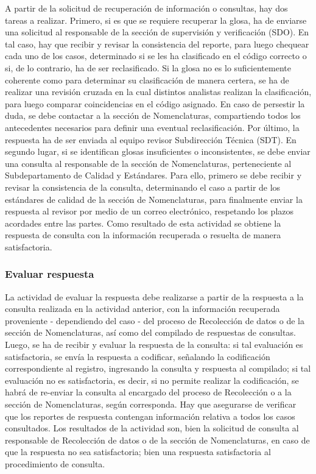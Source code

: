 \documentclass[
]{article}
\begin{document}
A partir de la solicitud de recuperación de información o consultas, hay dos tareas a realizar. Primero, si es que se requiere recuperar la glosa, ha de enviarse una solicitud al responsable de la sección de supervisión y verificación (SDO). En tal caso, hay que recibir y revisar la consistencia del reporte, para luego chequear cada uno de los casos, determinado si se les ha clasificado en el código correcto o si, de lo contrario, ha de ser reclasificado. Si la glosa no es lo suficientemente coherente como para determinar su clasificación de manera certera, se ha de realizar una revisión cruzada en la cual distintos analistas realizan la clasificación, para luego comparar coincidencias en el código asignado. En caso de persestir la duda, se debe contactar a la sección de Nomenclaturas, compartiendo todos los antecedentes necesarios para definir una eventual reclasificación. Por último, la respuesta ha de ser enviada al equipo revisor Subdirección Técnica (SDT). En segundo lugar, si se identifican glosas insuficientes o inconsistentes, se debe enviar una consulta al responsable de la sección de Nomenclaturas, perteneciente al Subdepartamento de Calidad y Estándares. Para ello, primero se debe recibir y revisar la consistencia de la consulta, determinando el caso a partir de los estándares de calidad de la sección de Nomenclaturas, para finalmente enviar la respuesta al revisor por medio de un correo electrónico, respetando los plazos acordades entre las partes. Como resultado de esta actividad se obtiene la respuesta de consulta con la información recuperada o resuelta de manera satisfactoria.

\hypertarget{evaluar-respuesta}{%
\subsubsection{Evaluar respuesta}\label{evaluar-respuesta}}

La actividad de evaluar la respuesta debe realizarse a partir de la respuesta a la consulta realizada en la actividad anterior, con la información recuperada proveniente - dependiendo del caso - del proceso de Recolección de datos o de la sección de Nomenclaturas, así como del compilado de respuestas de consultas. Luego, se ha de recibir y evaluar la respuesta de la consulta: si tal evaluación es satisfactoria, se envía la respuesta a codificar, señalando la codificación correspondiente al registro, ingresando la consulta y respuesta al compilado; si tal evaluación no es satisfactoria, es decir, si no permite realizar la codificación, se habrá de re-enviar la consulta al encargado del proceso de Recolección o a la sección de Nomenclaturas, según corresponda. Hay que asegurarse de verificar que los reportes de respuesta contengan información relativa a todos los casos consultados. Los resultados de la actividad son, bien la solicitud de consulta al responsable de Recolección de datos o de la sección de Nomenclaturas, en caso de que la respuesta no sea satisfactoria; bien una respuesta satisfactoria al procedimiento de consulta.
\end{document}
